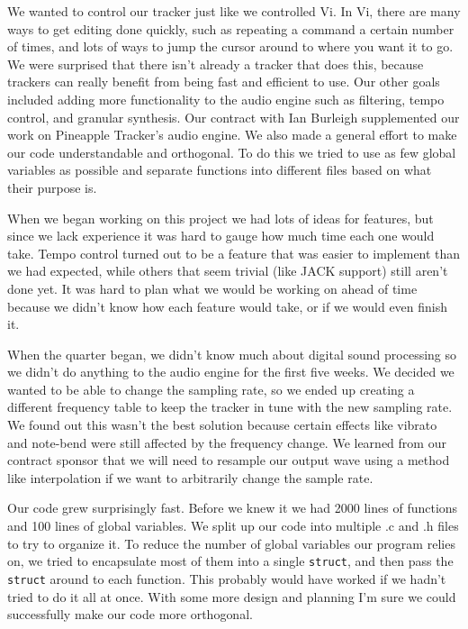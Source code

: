 \documentclass[12pt,letterpaper]{article}
\begin{document}
\par
We wanted to control our tracker just like we controlled Vi.
In Vi, there are many ways to get editing done quickly, such as repeating a command a certain number of times, and lots of ways to jump the cursor around to where you want it to go.
We were surprised that there isn't already a tracker that does this, because trackers can really benefit from being fast and efficient to use.
Our other goals included adding more functionality to the audio engine such as filtering, tempo control, and granular synthesis.
Our contract with Ian Burleigh supplemented our work on Pineapple Tracker's audio engine.
We also made a general effort to make our code understandable and orthogonal.
To do this we tried to use as few global variables as possible and separate functions into different files based on what their purpose is.

\par
When we began working on this project we had lots of ideas for features, but since we lack experience it was hard to gauge how much time each one would take.
Tempo control turned out to be a feature that was easier to implement than we had expected, while others that seem trivial (like JACK support) still aren't done yet.
It was hard to plan what we would be working on ahead of time because we didn't know how each feature would take, or if we would even finish it.

\par
When the quarter began, we didn't know much about digital sound processing so we didn't do anything to the audio engine for the first five weeks.
We decided we wanted to be able to change the sampling rate, so we ended up creating a different frequency table to keep the tracker in tune with the new sampling rate.
We found out this wasn't the best solution because certain effects like vibrato and note-bend were still affected by the frequency change.
We learned from our contract sponsor that we will need to resample our output wave using a method like interpolation if we want to arbitrarily change the sample rate.

\par
Our code grew surprisingly fast.
Before we knew it we had 2000 lines of functions and 100 lines of global variables.
We split up our code into multiple .c and .h files to try to organize it.
To reduce the number of global variables our program relies on, we tried to encapsulate most of them into a single {\tt struct}, and then pass the {\tt struct} around to each function.
This probably would have worked if we hadn't tried to do it all at once.
With some more design and planning I'm sure we could successfully make our code more orthogonal.
\end{document}
